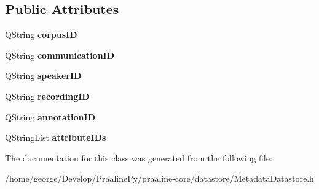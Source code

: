 \subsection*{Public Attributes}
\begin{DoxyCompactItemize}
\item 
\mbox{\label{class_metadata_datastore_1_1_selection_a156f0ff0006bc39e2e92de9b3860b67f}} 
Q\+String {\bfseries corpus\+ID}
\item 
\mbox{\label{class_metadata_datastore_1_1_selection_a0212ffc312a741c8e242978abff59b26}} 
Q\+String {\bfseries communication\+ID}
\item 
\mbox{\label{class_metadata_datastore_1_1_selection_a459723a5e405261ab649510daa35dd85}} 
Q\+String {\bfseries speaker\+ID}
\item 
\mbox{\label{class_metadata_datastore_1_1_selection_a189a71d010132977906cf63c05e9531a}} 
Q\+String {\bfseries recording\+ID}
\item 
\mbox{\label{class_metadata_datastore_1_1_selection_adfeab4a216b7da2a08b64f93cf859653}} 
Q\+String {\bfseries annotation\+ID}
\item 
\mbox{\label{class_metadata_datastore_1_1_selection_ac2d0af7a05bc19b8a8bec766e35df821}} 
Q\+String\+List {\bfseries attribute\+I\+Ds}
\end{DoxyCompactItemize}


The documentation for this class was generated from the following file\+:\begin{DoxyCompactItemize}
\item 
/home/george/\+Develop/\+Praaline\+Py/praaline-\/core/datastore/Metadata\+Datastore.\+h\end{DoxyCompactItemize}

